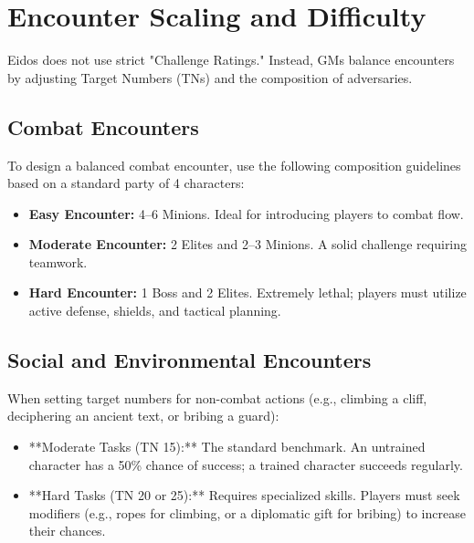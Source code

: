 \section{Encounter Scaling and Difficulty}

Eidos does not use strict "Challenge Ratings." Instead, GMs balance encounters by adjusting Target Numbers (TNs) and the composition of adversaries.

\subsection{Combat Encounters}
To design a balanced combat encounter, use the following composition guidelines based on a standard party of 4 characters:
\begin{itemize}
    \item \textbf{Easy Encounter:} 4–6 Minions. Ideal for introducing players to combat flow.
    \item \textbf{Moderate Encounter:} 2 Elites and 2–3 Minions. A solid challenge requiring teamwork.
    \item \textbf{Hard Encounter:} 1 Boss and 2 Elites. Extremely lethal; players must utilize active defense, shields, and tactical planning.
\end{itemize}

\subsection{Social and Environmental Encounters}
When setting target numbers for non-combat actions (e.g., climbing a cliff, deciphering an ancient text, or bribing a guard):
\begin{itemize}
    \item **Moderate Tasks (TN 15):** The standard benchmark. An untrained character has a 50\% chance of success; a trained character succeeds regularly.
    \item **Hard Tasks (TN 20 or 25):** Requires specialized skills. Players must seek modifiers (e.g., ropes for climbing, or a diplomatic gift for bribing) to increase their chances.
\end{itemize}
